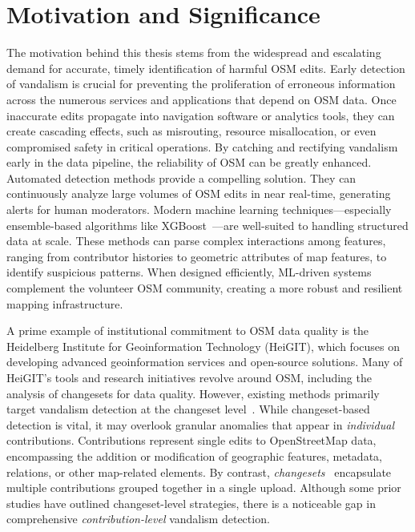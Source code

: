 \documentclass[
    13pt, %
    a4paper, %
    listof=totoc, %
    bibliography=totoc, %
    index=totoc, %
    headsepline
]{scrreprt}
\begin{document}
\section{Motivation and Significance}
\label{sec:motivation_significance}

The motivation behind this thesis stems from the widespread and escalating demand for accurate, timely identification of harmful OSM edits. Early detection of vandalism is crucial for preventing the proliferation of erroneous information across the numerous services and applications that depend on OSM data. Once inaccurate edits propagate into navigation software or analytics tools, they can create cascading effects, such as misrouting, resource misallocation, or even compromised safety in critical operations. By catching and rectifying vandalism early in the data pipeline, the reliability of OSM can be greatly enhanced. Automated detection methods provide a compelling solution. They can continuously analyze large volumes of OSM edits in near real-time, generating alerts for human moderators. Modern machine learning techniques—especially ensemble-based algorithms like XGBoost~\cite{xgboost_documentation, chen2016xgboost}—are well-suited to handling structured data at scale. These methods can parse complex interactions among features, ranging from contributor histories to geometric attributes of map features, to identify suspicious patterns. When designed efficiently, ML-driven systems complement the volunteer OSM community, creating a more robust and resilient mapping infrastructure.

A prime example of institutional commitment to OSM data quality is the Heidelberg Institute for Geoinformation Technology (HeiGIT)\cite{heigit_website}, which focuses on developing advanced geoinformation services and open-source solutions. Many of HeiGIT’s tools and research initiatives revolve around OSM, including the analysis of changesets for data quality. However, existing methods primarily target vandalism detection at the changeset level~\cite{Li2021, Tempelmeier2022}. While changeset-based detection is vital, it may overlook granular anomalies that appear in \emph{individual} contributions. Contributions represent single edits to OpenStreetMap data, encompassing the addition or modification of geographic features, metadata, relations, or other map-related elements. By contrast, \emph{changesets}~\cite{osm_changesets} encapsulate multiple contributions grouped together in a single upload. Although some prior studies have outlined changeset-level strategies, there is a noticeable gap in comprehensive \emph{contribution-level} vandalism detection.
\end{document}

